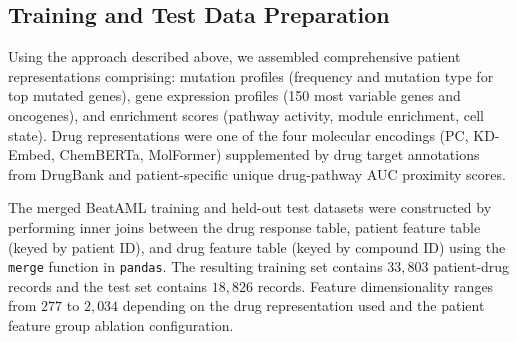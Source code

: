 \documentclass[pdflatex,sn-mathphys-num]{sn-jnl}
\theoremstyle{thmstyleone}
\theoremstyle{thmstyletwo}
\theoremstyle{thmstylethree}
\begin{document}
\subsection{Training and Test Data Preparation}\label{sec2.7}
Using the approach described above, we assembled comprehensive patient representations comprising: mutation profiles (frequency and mutation type for top mutated genes), gene expression profiles (150 most variable genes and oncogenes), and enrichment scores (pathway activity, module enrichment, cell state). Drug representations were one of the four molecular encodings (PC, KD-Embed, ChemBERTa, MolFormer) supplemented by drug target annotations from DrugBank \cite{knox2024drugbank} and patient-specific unique drug-pathway AUC proximity scores.

The merged BeatAML training and held-out test datasets were constructed by performing inner joins between the drug response table, patient feature table (keyed by patient ID), and drug feature table (keyed by compound ID) using the \texttt{merge} function in \texttt{pandas}. The resulting training set contains $33{,}803$ patient-drug records and the test set contains $18{,}826$ records. Feature dimensionality ranges from $277$ to $2,034$ depending on the drug representation used and the patient feature group ablation configuration.
\end{document}
